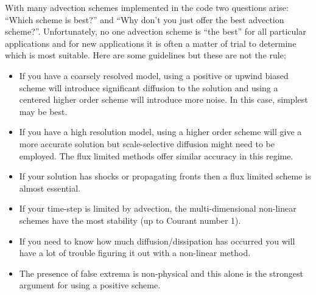 With many advection schemes implemented in the code two questions
arise: ``Which scheme is best?'' and ``Why don't you just offer the
best advection scheme?''. Unfortunately, no one advection scheme is
``the best'' for all particular applications and for new applications
it is often a matter of trial to determine which is most
suitable. Here are some guidelines but these are not the rule;
\begin{itemize}
\item If you have a coarsely resolved model, using a
positive or upwind biased scheme will introduce significant diffusion
to the solution and using a centered higher order scheme will
introduce more noise. In this case, simplest may be best.
\item If you have a high resolution model, using a higher order
scheme will give a more accurate solution but scale-selective
diffusion might need to be employed. The flux limited methods
offer similar accuracy in this regime.
\item If your solution has shocks or propagating fronts then a
flux limited scheme is almost essential.
\item If your time-step is limited by advection, the multi-dimensional
non-linear schemes have the most stability (up to Courant number 1).
\item If you need to know how much diffusion/dissipation has occurred you
will have a lot of trouble figuring it out with a non-linear method.
\item The presence of false extrema is non-physical and this alone is the
strongest argument for using a positive scheme.
\end{itemize}
